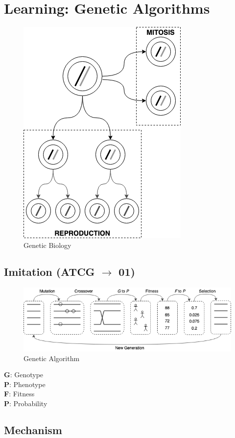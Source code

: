 \documentclass[12pt]{book}
\begin{document}
\section{Learning: Genetic Algorithms}
\begin{figure}[ht]
	\centering
	\includegraphics[scale=0.7]{Figure/Figure13_1.png}
	\caption{Genetic Biology}
\end{figure}
\subsection{Imitation (ATCG $\longrightarrow$ 01)}
\begin{figure}[ht]
	\centering
	\includegraphics[scale=0.7]{Figure/Figure13_2.png}
	\caption{Genetic Algorithm}
\end{figure}
\noindent\textbf{G}: Genotype\\
\textbf{P}: Phenotype\\
\textbf{F}: Fitness\\
\textbf{P}: Probability
\newpage
\subsection{Mechanism}
\end{document}
